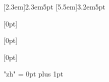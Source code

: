 \usepackage{booktabs}
\usepackage{titletoc}
\usepackage{tocloft}
\usepackage{zhnumber}
\usepackage{zhlipsum}
\usepackage[font=small]{caption}

\contentsmargin{0pt}
\renewcommand\contentspage{\thecontentspage}

[2.3em]{}{2.3em}{5pt}
[5.5em]{}{3.2em}{5pt}


[0pt]
{}
{\bfseries\chaptername\ \thecontentslabel\quad}
{}
{\bfseries\dotfill\contentspage\\\vspace{0mm}}

[0pt]
{}
{\bfseries\ \thecontentslabel\quad}
{}
{\bfseries\dotfill\contentspage\\\vspace{0mm}}

[0pt]
{}
{\hspace{2em}\bfseries\ \thecontentslabel\quad}
{}
{\bfseries\dotfill\contentspage\\\vspace{0mm}}


\newcommand*{\noaddvspace}{\renewcommand*{\addvspace}[1]{}}
\addtocontents{lof}{\protect\noaddvspace}
\addtocontents{lot}{\protect\noaddvspace}

\usepackage{xeCJK}
\usepackage{ctex}
\setmainfont{Times New Roman}
\XeTeXlinebreaklocale "zh"
\XeTeXlinebreakskip = 0pt plus 1pt

\usepackage{mfirstuc}

\usepackage{graphicx}
\graphicspath{ {Images/} }
\usepackage{caption}
\usepackage{subcaption}
\renewcommand{\figurename}{圖}

\renewcommand{\tablename}{表}

\usepackage[a4paper,top=2.54cm,bottom=2.54cm, left=3cm, right=3cm]{geometry}


\usepackage{indentfirst}
\setlength{\parindent}{4em} 

\setlength{\parskip}{1em}

\renewcommand{\baselinestretch}{2}

